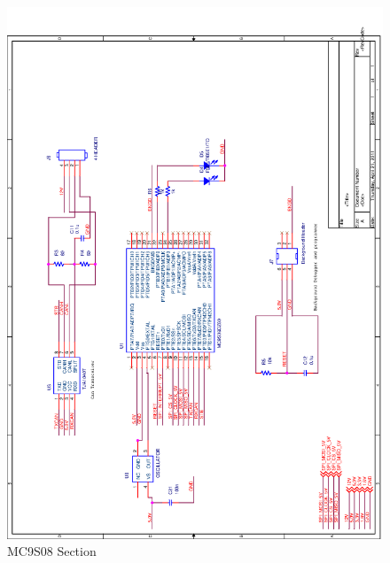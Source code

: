 \documentclass[11pt]{report} %
\begin{document}
	\begin{figure}[H]
		\centering
		\includegraphics[scale=0.50]{images/final_s08.png}
		\caption{MC9S08 Section}\label{fig:s08_board}
	\end{figure}
\end{document}
